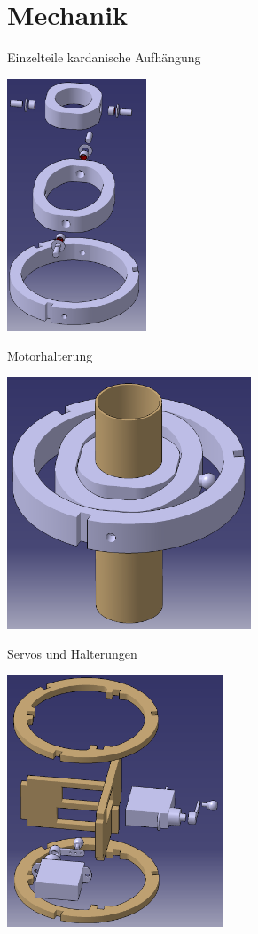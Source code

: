 \documentclass{beamer}
\begin{document}
\section{Mechanik}

\begin{frame}{Einzelteile kardanische Aufhängung}
\begin{center}\includegraphics[height=75mm]{kardan_1.png}\end{center}
\end{frame}

\begin{frame}{Motorhalterung}
\begin{center}\includegraphics[height=75mm]{motor_1.png}\end{center}
\end{frame}

\begin{frame}{Servos und Halterungen}
\begin{center}\includegraphics[height=75mm]{servo_1.png}\end{center}
\end{frame}
\end{document}
